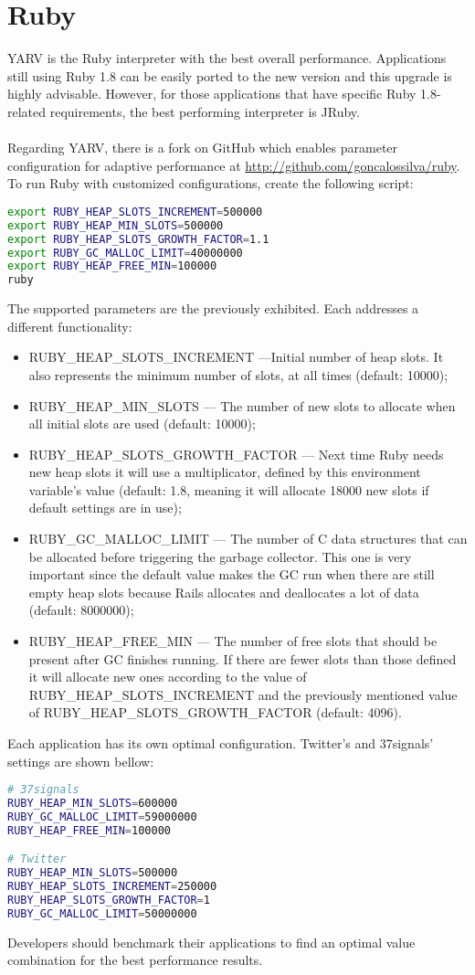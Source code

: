 \section{Ruby}
YARV is the Ruby interpreter with the best overall performance. Applications still using Ruby 1.8 can be easily ported to the new version and this upgrade is highly advisable. However, for those applications that have specific Ruby 1.8-related requirements, the best performing interpreter is JRuby.\\\\
Regarding YARV, there is a fork on GitHub which enables parameter configuration for adaptive performance at \url{http://github.com/goncalossilva/ruby}. To run Ruby with customized configurations, create the following script:
\begin{lstlisting}[language=bash]
export RUBY_HEAP_SLOTS_INCREMENT=500000
export RUBY_HEAP_MIN_SLOTS=500000
export RUBY_HEAP_SLOTS_GROWTH_FACTOR=1.1
export RUBY_GC_MALLOC_LIMIT=40000000
export RUBY_HEAP_FREE_MIN=100000
ruby
\end{lstlisting}
The supported parameters are the previously exhibited. Each addresses a different functionality:
\begin{itemize}
  \item RUBY\_HEAP\_SLOTS\_INCREMENT ---Initial number of heap slots. It also represents the minimum number of slots, at all times (default: 10000);
  \item RUBY\_HEAP\_MIN\_SLOTS --- The number of new slots to allocate when all initial slots are used (default: 10000);
  \item RUBY\_HEAP\_SLOTS\_GROWTH\_FACTOR --- Next time Ruby needs new heap slots it will use a multiplicator, defined by this environment variable’s value (default: 1.8, meaning it will allocate 18000 new slots if default settings are in use);
  \item RUBY\_GC\_MALLOC\_LIMIT --- The number of C data structures that can be allocated before triggering the garbage collector. This one is very important since the default value makes the GC run when there are still empty heap slots because Rails allocates and deallocates a lot of data (default: 8000000);
  \item RUBY\_HEAP\_FREE\_MIN --- The number of free slots that should be present after GC finishes running. If there are fewer slots than those defined it will allocate new ones according to the value of RUBY\_HEAP\_SLOTS\_INCREMENT and the previously mentioned value of RUBY\_HEAP\_SLOTS\_GROWTH\_FACTOR (default: 4096).
\end{itemize}
Each application has its own optimal configuration. Twitter's and 37signals' settings are shown bellow:
\begin{lstlisting}[language=bash]
# 37signals
RUBY_HEAP_MIN_SLOTS=600000
RUBY_GC_MALLOC_LIMIT=59000000
RUBY_HEAP_FREE_MIN=100000

# Twitter
RUBY_HEAP_MIN_SLOTS=500000
RUBY_HEAP_SLOTS_INCREMENT=250000
RUBY_HEAP_SLOTS_GROWTH_FACTOR=1
RUBY_GC_MALLOC_LIMIT=50000000
\end{lstlisting}
Developers should benchmark their applications to find an optimal value combination for the best performance results.

